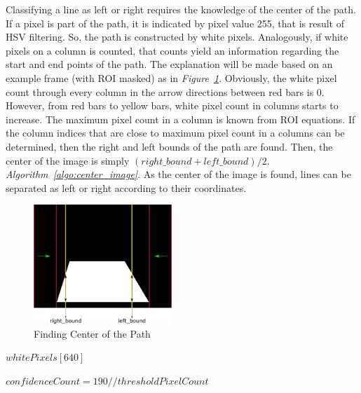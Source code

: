 \documentclass[a4paper,12pt]{article}
\begin{document}
\begin{enumerate}[A.]
	Classifying a line as left or right requires the knowledge of the center of the path. If a pixel is part of the path, it is indicated by pixel value 255, that is result of HSV filtering. So, the path is constructed by white pixels. Analogously, if white pixels on a column is counted, that counts yield an information regarding the start and end points of the path. The explanation will be made based on an example frame (with ROI masked) as in \textit{Figure~\ref{fig:explanation_center_of_image}}. Obviously, the white pixel count through every column in the arrow directions between red bars is 0. However, from red bars to yellow bars, white pixel count in columns starts to increase. The maximum pixel count in a column is known from ROI equations. If the column indices that are close to maximum pixel count in a columns can be determined, then the right and left bounds of the path are found. Then, the center of the image is simply $(right\_bound + left\_bound)/2$. \textit{Algorithm~\ref{algo:center_image}}. As the center of the image is found, lines can be separated as left or right according to their coordinates.

\begin{figure}[h]
	
	\includegraphics[width=0.465\textwidth,center]{images/ROT_ROI/explanation_center_of_image}
	
	\caption{Finding Center of the Path}\label{fig:explanation_center_of_image}
	
\end{figure}
\begin{algorithm}
	\DontPrintSemicolon
		$whitePixels[640]$\;

		$confidenceCount = 190 // threshold Pixel Count$\;

	
\end{algorithm}
\end{enumerate}
\end{document}
